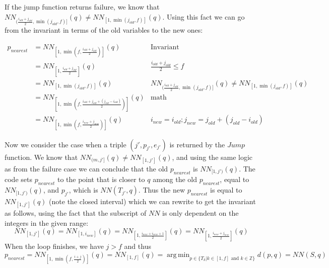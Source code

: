\documentclass[12pt,a4paper,USenglish,cleveref, autoref, thm-restate]{article}
\newcommand{\NN}{\mathit{NN}}
\newcommand{\old}{\mathit{old}}
\newcommand{\new}{\mathit{new}}
\DeclareMathOperator*{\argmin}{arg\,min}
\newcommand{\NN}{\mathit{NN}}
\newcommand{\old}{\mathit{old}}
\newcommand{\new}{\mathit{new}}
\DeclareMathOperator*{\argmin}{arg\,min}
\newcommand{\NN}{\mathit{NN}}
\newcommand{\old}{\mathit{old}}
\newcommand{\new}{\mathit{new}}
\DeclareMathOperator*{\argmin}{arg\,min}
\begin{document}
If the jump function returns failure, we know that
$\NN_{(\frac{i_{\old}+j_{\old}}{2},\min(j_{\old},f)]}(q) \not = \NN_{[1,\min(j_{\old},f)]}(q)$. Using this fact we can go from the invariant in terms of the old variables to the new ones:


\begin{align*}
p_{nearest}&=\NN_{[1,\min(f,\frac{i_{\old}+j_{\old}}{2})]}(q)&
\text{Invariant}
\\
&=\NN_{[1,\frac{i_{\old}+j_{\old}}{2}]}(q)
& \frac{i_{\old}+j_{\old}}{2} \leq  f
\\
&=\NN_{[1,\min(j_{\old},f)]}(q)
& \NN_{(\frac{i_{\old}+j_{\old}}{2},\min(j_{\old},f)]}(q) \not = \NN_{[1,\min(j_{\old},f)]}(q)
\\
 & =\NN_{[1,\min(f,\frac{i_{\old}+j_{\old}+(j_{\old}-i_{\old})}{2})]}(q)
 &
\text{math}
\\
 & =\NN_{[1,\min(f,\frac{i_{\new}+j_{\new}}{2})]}(q)
 & i_{\new}=i_{\old};j_{\new}=j_{\old}+(j_{\old}-i_{\old})
\end{align*}

Now we consider the case when  a triple $(j',p_{j'},e_{j'})$ is returned by the $Jump$ function. We know that $\NN_{(m,j']}(q) \not = \NN_{[1,j']}(q)$, and using the same logic as from the failure case we can conclude that the old $p_{nearest}$ is
$\NN_{[1,j')}(q)$. The code sets $p_{nearest}$ to the point that is closer to $q$ among the old $p_{nearest}$, equal to $\NN_{[1,j')}(q)$, and $p_{j'}$, which is $\NN(T_{j'},q)$.
Thus the new $p_{nearest}$ is equal to $\NN_{[1,j']}(q)$ (note the closed interval) which we can rewrite to get the invariant as follows, using the fact that the subscript of $\NN$ is only dependent on the integers in the given range:
\[    \NN_{[1,j']}(q)
    =     \NN_{[1,i_{\new}]}(q)
    =     \NN_{[1,\frac{i_{\new}+i_{\new}+1}{2}]}(q)
    =     \NN_{[1,\frac{i_{\new}+j_{\new}}{2}]}(q)
\]%
When the loop finishes, we have $j>f$ and thus
%
\[p_{nearest} 
= \NN_{[1,\min (f,\frac{i+j}{2})]}(q)
= \NN_{[1,f]}(q)
= \argmin_{p\in \{ T_k|k\in [1,f]  \text{ and } k \in \mathbb{Z}\}}d(p,q)
= \NN(S,q)
\]
\end{document}
